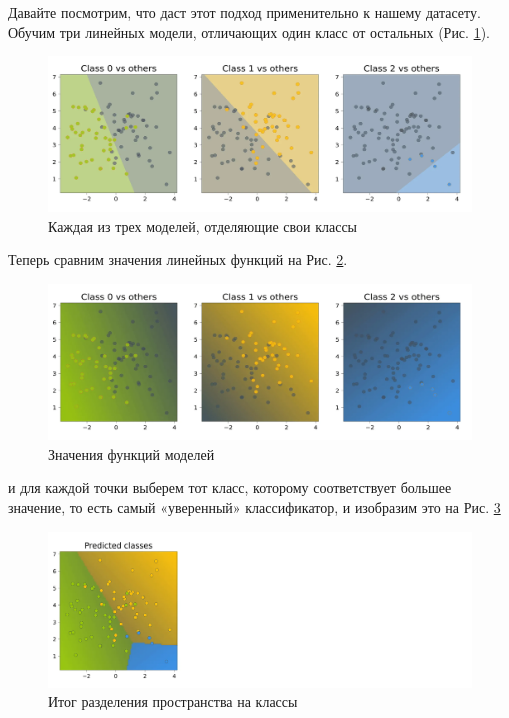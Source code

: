 Давайте посмотрим, что даст этот подход применительно к нашему датасету. Обучим три линейных модели, отличающих один класс от остальных (Рис. \ref{fig:linear-multi-ova-models}).

\begin{figure}[H]
	\centering
	\includegraphics[width=0.8\linewidth]{chapters/linear/pics/multi-ova-models.png}
	\caption{Каждая из трех моделей, отделяющие свои классы}
	\label{fig:linear-multi-ova-models}
\end{figure}

Теперь сравним значения линейных функций на Рис. \ref{fig:linear-multi-ova-values}.

\begin{figure}[H]
	\centering
	\includegraphics[width=0.8\linewidth]{chapters/linear/pics/multi-ova-values.png}
	\caption{Значения функций моделей}
	\label{fig:linear-multi-ova-values}
\end{figure}

и для каждой точки выберем тот класс, которому соответствует большее значение, то есть самый «уверенный» классификатор, и изобразим это на Рис. \ref{fig:linear-multi-ova-final}

\begin{figure}[H]
	\centering
	\includegraphics[width=0.8\linewidth]{chapters/linear/pics/multi-ova-final.png}
	\caption{Итог разделения пространства на классы}
	\label{fig:linear-multi-ova-final}
\end{figure}

